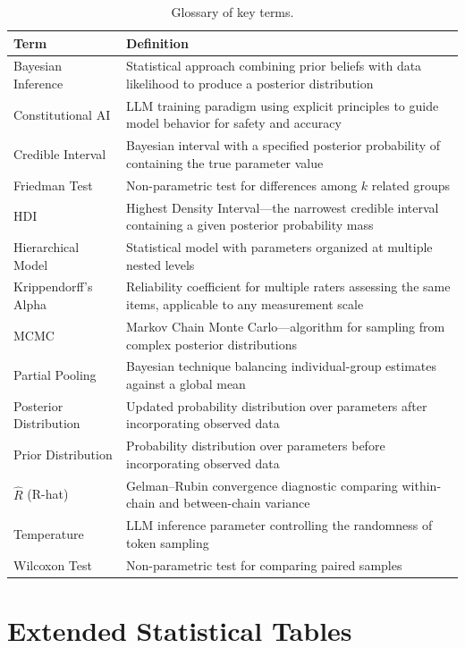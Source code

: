 \documentclass[10pt,letterpaper]{article}
\begin{document}
\begin{table}[h]
\centering
\caption{Glossary of key terms.}
\begin{tabular}{lp{9cm}}
\toprule
\textbf{Term} & \textbf{Definition} \\
\midrule
Bayesian Inference    & Statistical approach combining prior beliefs with data likelihood to produce a posterior distribution \\
Constitutional AI     & LLM training paradigm using explicit principles to guide model behavior for safety and accuracy \\
Credible Interval     & Bayesian interval with a specified posterior probability of containing the true parameter value \\
Friedman Test         & Non-parametric test for differences among $k$ related groups \\
HDI                   & Highest Density Interval---the narrowest credible interval containing a given posterior probability mass \\
Hierarchical Model    & Statistical model with parameters organized at multiple nested levels \\
Krippendorff's Alpha  & Reliability coefficient for multiple raters assessing the same items, applicable to any measurement scale \\
MCMC                  & Markov Chain Monte Carlo---algorithm for sampling from complex posterior distributions \\
Partial Pooling       & Bayesian technique balancing individual-group estimates against a global mean \\
Posterior Distribution & Updated probability distribution over parameters after incorporating observed data \\
Prior Distribution    & Probability distribution over parameters before incorporating observed data \\
$\hat{R}$ (R-hat)    & Gelman--Rubin convergence diagnostic comparing within-chain and between-chain variance \\
Temperature           & LLM inference parameter controlling the randomness of token sampling \\
Wilcoxon Test         & Non-parametric test for comparing paired samples \\
\bottomrule
\end{tabular}
\end{table}

\section{Extended Statistical Tables}
\label{app:extended_tables}
\end{document}
